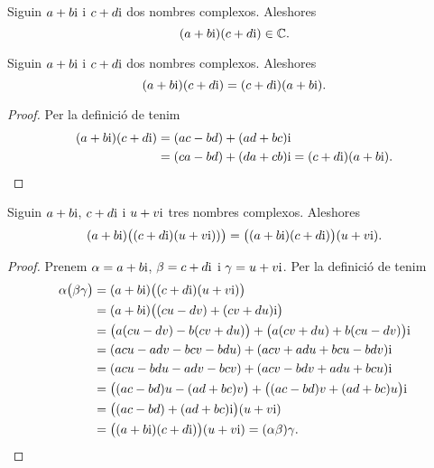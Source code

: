 \documentclass[../../Main.tex]{subfiles}
\begin{document}
	\begin{observation}
		\label{obs:els nombres complexos estan tancats pel producte}
		Siguin \(a+b\mathrm{i}\) i \(c+d\mathrm{i}\) dos nombres complexos.
        Aleshores
		\[
            (a+b\mathrm{i})(c+d\mathrm{i})\in\mathbb{C}.
        \]
	\end{observation}
	\begin{proposition}
		\label{prop:els nombres complexos commuten pel producte}
		Siguin \(a+b\mathrm{i}\) i \(c+d\mathrm{i}\) dos nombres complexos.
        Aleshores
		\[
            (a+b\mathrm{i})(c+d\mathrm{i}) = (c+d\mathrm{i})(a+b\mathrm{i}).
        \]
		\begin{proof}
			Per la definició de  tenim
			\begin{align*}
				(a+b\mathrm{i})(c+d\mathrm{i}) &= (ac-bd)+(ad+bc)\mathrm{i} \\
				 &= (ca-bd)+(da+cb)\mathrm{i} = (c+d\mathrm{i})(a+b\mathrm{i}).\qedhere
			\end{align*}
		\end{proof}
	\end{proposition}
	\begin{proposition}
		\label{prop:els nombres complexos són associatius pel producte}
		Siguin \(a+b\mathrm{i}\), \(c+d\mathrm{i}\) i \(u+v\mathrm{i}\) tres nombres complexos.
        Aleshores
		\[
            (a+b\mathrm{i})\big((c+d\mathrm{i})(u+v\mathrm{i}))\big)
            = \big((a+b\mathrm{i})(c+d\mathrm{i})\big)(u+v\mathrm{i}).
        \]
		\begin{proof}
			Prenem \(\alpha = a+b\mathrm{i}\), \(\beta = c+d\mathrm{i}\)
            i \(\gamma = u+v\mathrm{i}\).
            Per la definició de  tenim
			\begin{align*}
				\alpha\big(\beta\gamma\big)
                    &= (a+b\mathrm{i})\big((c+d\mathrm{i})(u+v\mathrm{i})\big) \\
                    &= (a+b\mathrm{i})\big((cu-dv)+(cv+du)\mathrm{i}\big) \\
                    &= \big(a(cu-dv)-b(cv+du)\big)
                       +\big(a(cv+du)+b(cu-dv)\big)\mathrm{i} \\
                    &= (acu-adv-bcv-bdu)+(acv+adu+bcu-bdv)\mathrm{i} \\
                    &= (acu-bdu-adv-bcv)+(acv-bdv+adu+bcu)\mathrm{i} \\
                    &= \big((ac-bd)u-(ad+bc)v\big)
                       +\big((ac-bd)v+(ad+bc)u\big)\mathrm{i} \\
                    &= \big((ac-bd)+(ad+bc)\mathrm{i}\big)(u+v\mathrm{i}) \\
                    &= \big((a+b\mathrm{i})(c+d\mathrm{i})\big)(u+v\mathrm{i})
                     = (\alpha\beta)\gamma.\qedhere
			\end{align*}
		\end{proof}
	\end{proposition}
\end{document}

